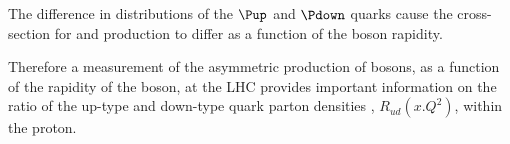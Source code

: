 
The difference in distributions of the $\Pup$ and $\Pdown$ quarks cause the
cross-section for \PWp and \PWm production to differ as a function of the boson
rapidity.

Therefore a measurement of the asymmetric production of \PW bosons, as a
function of the rapidity of the boson, at the \ac{LHC} provides important
information on the ratio of the up-type and down-type quark parton densities ,
$R_{ud}(x.Q^2)$, within the proton. 





